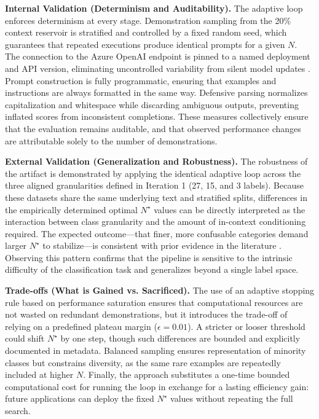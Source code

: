 \textbf{Internal Validation (Determinism and Auditability).}  
The adaptive loop enforces determinism at every stage. Demonstration sampling from the 20\% context reservoir is stratified and controlled by a fixed random seed, which guarantees that repeated executions produce identical prompts for a given $N$. The connection to the Azure OpenAI endpoint is pinned to a named deployment and API version, eliminating uncontrolled variability from silent model updates \cite{openai2023gpt4}. Prompt construction is fully programmatic, ensuring that examples and instructions are always formatted in the same way. Defensive parsing normalizes capitalization and whitespace while discarding ambiguous outputs, preventing inflated scores from inconsistent completions. These measures collectively ensure that the evaluation remains auditable, and that observed performance changes are attributable solely to the number of demonstrations.  

\textbf{External Validation (Generalization and Robustness).}  
The robustness of the artifact is demonstrated by applying the identical adaptive loop across the three aligned granularities defined in Iteration 1 (27, 15, and 3 labels). Because these datasets share the same underlying text and stratified splits, differences in the empirically determined optimal $N^{\star}$ values can be directly interpreted as the interaction between class granularity and the amount of in-context conditioning required. The expected outcome---that finer, more confusable categories demand larger $N^{\star}$ to stabilize---is consistent with prior evidence in the literature \cite{brown2020gpt3}. Observing this pattern confirms that the pipeline is sensitive to the intrinsic difficulty of the classification task and generalizes beyond a single label space.  

\textbf{Trade-offs (What is Gained vs. Sacrificed).}  
The use of an adaptive stopping rule based on performance saturation ensures that computational resources are not wasted on redundant demonstrations, but it introduces the trade-off of relying on a predefined plateau margin ($\epsilon=0.01$). A stricter or looser threshold could shift $N^{\star}$ by one step, though such differences are bounded and explicitly documented in metadata. Balanced sampling ensures representation of minority classes but constrains diversity, as the same rare examples are repeatedly included at higher $N$. Finally, the approach substitutes a one-time bounded computational cost for running the loop in exchange for a lasting efficiency gain: future applications can deploy the fixed $N^{\star}$ values without repeating the full search.  


